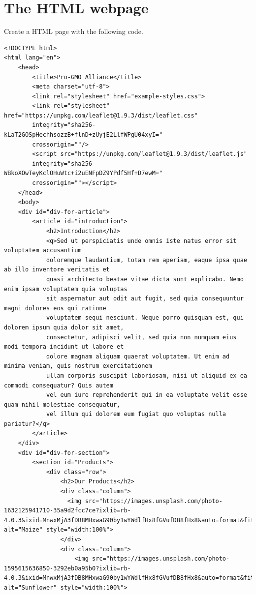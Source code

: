 \documentclass[
]{book}
\begin{document}
\hypertarget{the-html-webpage}{%
\section{The HTML webpage}\label{the-html-webpage}}

Create a HTML page with the following code.

\begin{verbatim}
<!DOCTYPE html>
<html lang="en">
    <head>
        <title>Pro-GMO Alliance</title>
        <meta charset="utf-8">
        <link rel="stylesheet" href="example-styles.css">
        <link rel="stylesheet" href="https://unpkg.com/leaflet@1.9.3/dist/leaflet.css"
        integrity="sha256-kLaT2GOSpHechhsozzB+flnD+zUyjE2LlfWPgU04xyI="
        crossorigin=""/>
        <script src="https://unpkg.com/leaflet@1.9.3/dist/leaflet.js"
        integrity="sha256-WBkoXOwTeyKclOHuWtc+i2uENFpDZ9YPdf5Hf+D7ewM="
        crossorigin=""></script>
    </head>
    <body>
    <div id="div-for-article">
        <article id="introduction">
            <h2>Introduction</h2>
            <q>Sed ut perspiciatis unde omnis iste natus error sit voluptatem accusantium 
            doloremque laudantium, totam rem aperiam, eaque ipsa quae ab illo inventore veritatis et 
            quasi architecto beatae vitae dicta sunt explicabo. Nemo enim ipsam voluptatem quia voluptas 
            sit aspernatur aut odit aut fugit, sed quia consequuntur magni dolores eos qui ratione 
            voluptatem sequi nesciunt. Neque porro quisquam est, qui dolorem ipsum quia dolor sit amet, 
            consectetur, adipisci velit, sed quia non numquam eius modi tempora incidunt ut labore et 
            dolore magnam aliquam quaerat voluptatem. Ut enim ad minima veniam, quis nostrum exercitationem 
            ullam corporis suscipit laboriosam, nisi ut aliquid ex ea commodi consequatur? Quis autem 
            vel eum iure reprehenderit qui in ea voluptate velit esse quam nihil molestiae consequatur, 
            vel illum qui dolorem eum fugiat quo voluptas nulla pariatur?</q>
        </article>
    </div>
    <div id="div-for-section">
        <section id="Products">
            <div class="row">
                <h2>Our Products</h2>
                <div class="column">
                  <img src="https://images.unsplash.com/photo-1632125941710-35a9d2fcc7ce?ixlib=rb-4.0.3&ixid=MnwxMjA3fDB8MHxwaG90by1wYWdlfHx8fGVufDB8fHx8&auto=format&fit=crop&w=1170&q=80" alt="Maize" style="width:100%">
                </div>
                <div class="column">
                    <img src="https://images.unsplash.com/photo-1595615636850-3292eb0a95b0?ixlib=rb-4.0.3&ixid=MnwxMjA3fDB8MHxwaG90by1wYWdlfHx8fGVufDB8fHx8&auto=format&fit=crop&w=1170&q=80" alt="Sunflower" style="width:100%">

\end{verbatim}
\end{document}
